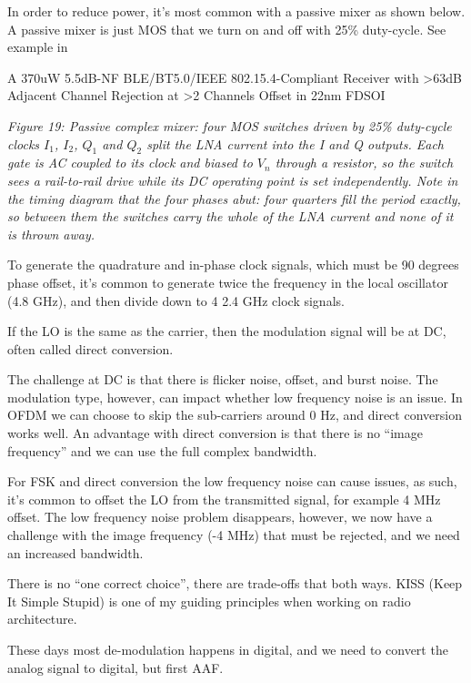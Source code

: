 In order to reduce power, it's most common with a passive mixer as shown
below. A passive mixer is just MOS that we turn on and off with 25\%
duty-cycle. See example in

A 370uW 5.5dB-NF BLE/BT5.0/IEEE 802.15.4-Compliant Receiver with
\textgreater63dB Adjacent Channel Rejection at \textgreater2 Channels
Offset in 22nm FDSOI 


{
\centering
{}
}

\emph{Figure 19: Passive complex mixer: four MOS switches driven by 25\%
duty-cycle clocks \(I_1\), \(I_2\), \(Q_1\) and \(Q_2\) split the LNA
current into the I and Q outputs. Each gate is AC coupled to its clock
and biased to \(V_n\) through a resistor, so the switch sees a
rail-to-rail drive while its DC operating point is set independently.
Note in the timing diagram that the four phases abut: four quarters fill
the period exactly, so between them the switches carry the whole of the
LNA current and none of it is thrown away.}

To generate the quadrature and in-phase clock signals, which must be 90
degrees phase offset, it's common to generate twice the frequency in the
local oscillator (4.8 GHz), and then divide down to 4 2.4 GHz clock
signals.

If the LO is the same as the carrier, then the modulation signal will be
at DC, often called direct conversion.

The challenge at DC is that there is flicker noise, offset, and burst
noise. The modulation type, however, can impact whether low frequency
noise is an issue. In OFDM we can choose to skip the sub-carriers around
0 Hz, and direct conversion works well. An advantage with direct
conversion is that there is no ``image frequency'' and we can use the
full complex bandwidth.

For FSK and direct conversion the low frequency noise can cause issues,
as such, it's common to offset the LO from the transmitted signal, for
example 4 MHz offset. The low frequency noise problem disappears,
however, we now have a challenge with the image frequency (-4 MHz) that
must be rejected, and we need an increased bandwidth.

There is no ``one correct choice'', there are trade-offs that both ways.
KISS (Keep It Simple Stupid) is one of my guiding principles when
working on radio architecture.

These days most de-modulation happens in digital, and we need to convert
the analog signal to digital, but first AAF.

